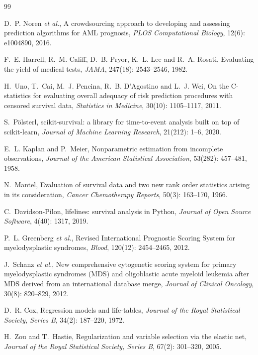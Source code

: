\documentclass[11pt,a4paper]{article}
\begin{document}
\begin{thebibliography}{99}

D.~P. Noren \textit{et al.},
A crowdsourcing approach to developing and assessing prediction algorithms for AML
prognosis,
\textit{PLOS Computational Biology}, 12(6): e1004890, 2016.

F.~E. Harrell, R.~M. Califf, D.~B. Pryor, K.~L. Lee and R.~A. Rosati,
Evaluating the yield of medical tests,
\textit{JAMA}, 247(18): 2543--2546, 1982.

H.~Uno, T.~Cai, M.~J. Pencina, R.~B. D'Agostino and L.~J. Wei,
On the C-statistics for evaluating overall adequacy of risk prediction procedures
with censored survival data,
\textit{Statistics in Medicine}, 30(10): 1105--1117, 2011.

S.~P\"olsterl,
scikit-survival: a library for time-to-event analysis built on top of scikit-learn,
\textit{Journal of Machine Learning Research}, 21(212): 1--6, 2020.

E.~L. Kaplan and P.~Meier,
Nonparametric estimation from incomplete observations,
\textit{Journal of the American Statistical Association}, 53(282): 457--481, 1958.

N.~Mantel,
Evaluation of survival data and two new rank order statistics arising in its
consideration,
\textit{Cancer Chemotherapy Reports}, 50(3): 163--170, 1966.

C.~Davidson-Pilon,
lifelines: survival analysis in Python,
\textit{Journal of Open Source Software}, 4(40): 1317, 2019.

P.~L. Greenberg \textit{et al.},
Revised International Prognostic Scoring System for myelodysplastic syndromes,
\textit{Blood}, 120(12): 2454--2465, 2012.

J.~Schanz \textit{et al.},
New comprehensive cytogenetic scoring system for primary myelodysplastic syndromes (MDS)
and oligoblastic acute myeloid leukemia after MDS derived from an international database
merge,
\textit{Journal of Clinical Oncology}, 30(8): 820--829, 2012.

D.~R. Cox,
Regression models and life-tables,
\textit{Journal of the Royal Statistical Society, Series B}, 34(2): 187--220, 1972.

H.~Zou and T.~Hastie,
Regularization and variable selection via the elastic net,
\textit{Journal of the Royal Statistical Society, Series B}, 67(2): 301--320, 2005.


\end{thebibliography}
\end{document}
